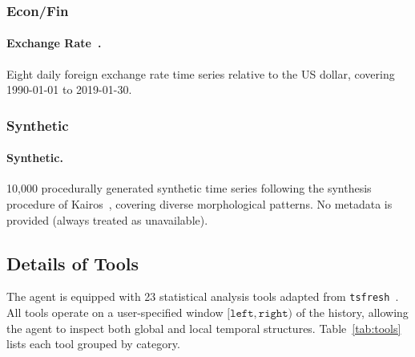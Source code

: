\documentclass[11pt]{article}
\begin{document}
\subsubsection{Econ/Fin}

\paragraph{Exchange Rate~\citep{lai2018modeling}.}
Eight daily foreign exchange rate time series relative to the US dollar, covering 1990-01-01 to 2019-01-30.

\subsubsection{Synthetic}

\paragraph{Synthetic.}
10{,}000 procedurally generated synthetic time series following the synthesis procedure of Kairos~\citep{feng2025kairos}, covering diverse morphological patterns. No metadata is provided (always treated as unavailable).



\subsection{Details of Tools}
\label{app:tools}

The agent is equipped with 23 statistical analysis tools adapted from \texttt{tsfresh}~\citep{christ2018time}.
All tools operate on a user-specified window $[\texttt{left}, \texttt{right})$ of the history, allowing the agent to inspect both global and local temporal structures.
Table~\ref{tab:tools} lists each tool grouped by category.
\end{document}
